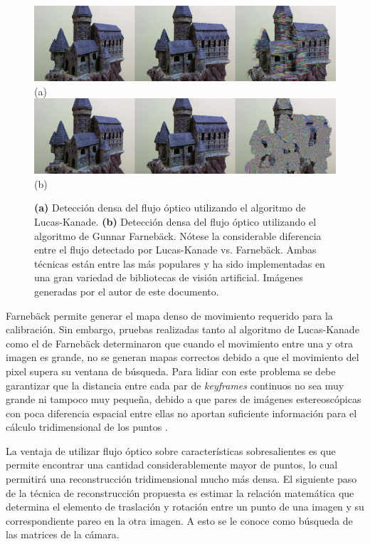 \begin{figure}[H]
\centering
\includegraphics[width=1.0\textwidth]{images/oflucaskanade1.png}
(a)
\includegraphics[width=1.0\textwidth]{images/offarneback1.png}
(b)
\caption[Detecci\'{o}n del flujo \'{o}ptico]%
{\textbf{(a)} Detecci\'{o}n densa del flujo \'{o}ptico utilizando el algoritmo de Lucas-Kanade. \textbf{(b)} Detecci\'{o}n densa del flujo \'{o}ptico utilizando el algoritmo de Gunnar Farnebäck. N\'{o}tese la considerable diferencia entre el flujo detectado por Lucas-Kanade vs. Farnebäck. Ambas t\'{e}cnicas est\'{a}n entre las m\'{a}s populares y ha sido implementadas en una gran variedad de bibliotecas de visi\'{o}n artificial. Im\'{a}genes generadas por el autor de este documento.}
\label{fig:OpticalFlow1}
\end{figure}


Farnebäck permite generar el mapa denso de movimiento requerido para la calibraci\'{o}n. Sin embargo, pruebas realizadas tanto al algoritmo de Lucas-Kanade como el de Farnebäck determinaron que cuando el movimiento entre una y otra imagen es grande, no se generan mapas correctos debido a que el movimiento del pixel supera su ventana de b\'{u}squeda. Para lidiar con este problema se debe garantizar que la distancia entre cada par de \textit{keyframes} continuos no sea muy grande ni tampoco muy peque\~na, debido a que pares de im\'{a}genes estereosc\'{o}picas con poca diferencia espacial entre ellas no aportan suficiente informaci\'{o}n para el c\'{a}lculo tridimensional de los puntos \cite{pan2009ProFORMA}.

La ventaja de utilizar flujo \'{o}ptico sobre caracter\'{i}sticas sobresalientes es que permite encontrar una cantidad considerablemente mayor de puntos, lo cual permitir\'{a} una reconstrucci\'{o}n tridimensional mucho m\'{a}s densa. El siguiente paso de la t\'{e}cnica de reconstrucci\'{o}n propuesta es estimar la relaci\'{o}n matem\'{a}tica que determina el elemento de traslaci\'{o}n y rotaci\'{o}n entre un punto de una imagen y su correspondiente pareo en la otra imagen. A esto se le conoce como b\'{u}squeda de las matrices de la c\'{a}mara.


